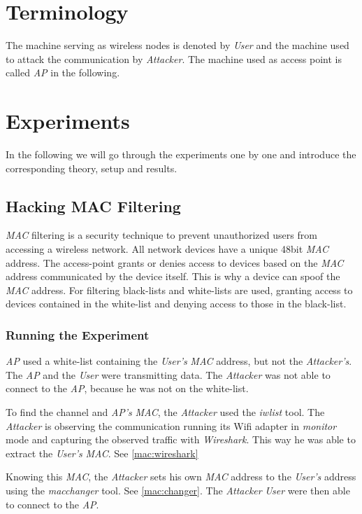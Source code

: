 \documentclass[12pt,a4paper]{article}
\begin{document}
\section{Terminology}
The machine serving as wireless nodes is denoted by \emph{User} and the machine used to attack the communication by \emph{Attacker}.
The machine used as access point is called \emph{AP} in the following.


\section{Experiments}
  In the following we will go through the experiments one by one and introduce the corresponding theory, setup and results.
  \subsection{Hacking MAC Filtering}
	  \emph{MAC} filtering is a security technique to prevent unauthorized users from accessing a wireless network.
	  All network devices have a unique 48bit \emph{MAC} address.
	  The access-point grants or denies access to devices based on the \emph{MAC} address communicated by the device itself. This is why a device can spoof the \emph{MAC} address.
	  For filtering black-lists and white-lists are used, granting access to devices contained in the white-list and denying access to those in the black-list.
	  
  \subsubsection{Running the Experiment}
	\emph{AP} used a white-list containing the \emph{User's} \emph{MAC} address, but not the \emph{Attacker's}.
	The \emph{AP} and the \emph{User} were transmitting data.
	The \emph{Attacker} was not able to connect to the \emph{AP}, because he was not on the white-list.
	
	To find the channel and \emph{AP's} \emph{MAC}, the \emph{Attacker} used the \emph{iwlist} tool.
	The \emph{Attacker} is observing the communication running its Wifi adapter in \emph{monitor} mode and capturing the observed traffic with \emph{Wireshark}. This way he was able to extract the \emph{User's} \emph{MAC}. See \autoref{mac:wireshark}
	
	Knowing this \emph{MAC}, the \emph{Attacker} sets his own \emph{MAC} address to the \emph{User's} address using the \emph{macchanger} tool. See \autoref{mac:changer}.
	The \emph{Attacker} \emph{User} were then able to connect to the \emph{AP}.
		
\end{document}
